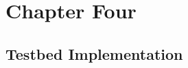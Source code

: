 \chapter{Chapter Four}
\label{ch:chapter_four}
\section{Testbed Implementation }
\label{sec:ch4_testbed}


